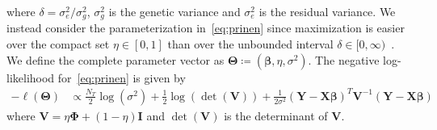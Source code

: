 \documentclass[12pt,letter]{article}\usepackage[]{graphicx}\usepackage[]{color}
\newcommand{\bX}{\textbf{X}}
\newcommand{\bY}{\textbf{Y}}
\newcommand{\bV}{\textbf{V}}
\newcommand{\bI}{\textbf{I}}
\newcommand{\bTheta}{\boldsymbol{\Theta}}
\newcommand{\bbeta}{\boldsymbol{\beta}}
\newcommand{\bPhi}{\boldsymbol{\Phi}}
\begin{document}
where $\delta = \sigma^2_e / \sigma^2_g$, $\sigma^2_g$ is the genetic variance and $\sigma^2_e$ is the residual variance. We instead consider the parameterization in~\eqref{eq:prinen} since maximization is easier over the compact set $\eta \in [0,1]$ than over the unbounded interval $\delta \in [0, \infty)$~\citep{pirinen2013efficient}. We define the complete parameter vector as $\bTheta \coloneqq \left(\bbeta, \eta, \sigma^2 \right)$. The negative log-likelihood for~\eqref{eq:prinen} is given by
\begin{align}
	-\ell(\bTheta) & \propto \frac{N_T}{2}\log(\sigma^2) + \frac{1}{2}\log\left(\det(\bV)\right) + \frac{1}{2\sigma^2} \left(\bY - \bX \bbeta\right)^T \bV^{-1} \left(\bY - \bX \bbeta\right)  \label{eq:LogLike}
\end{align}
where $\bV = \eta \bPhi + (1-\eta) \bI$ and $\det(\bV)$ is the determinant of $\bV$.
\end{document}
